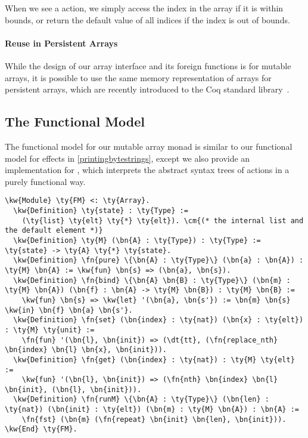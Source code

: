 When we see a  action, we simply access the index in the array if it is within bounds, or return the default value of all indices if the index is out of bounds.

\paragraph*{Reuse in Persistent Arrays} While the design of our array interface and its \gls{foreign function}s is for mutable arrays, it is possible to use the same memory representation of arrays for persistent arrays, which are recently introduced to the Coq standard library~\cite{conchon2007persistent, denes2013towards}.

\subsection{The Functional Model}

The \gls{functional model} for our mutable array monad is similar to our \gls{functional model} for effects in \autoref{printingbytestrings}, except we also provide an implementation for , which interprets the abstract syntax trees of actions in a purely functional way.

\begin{Verbatim}
\kw{Module} \ty{FM} <: \ty{Array}.
  \kw{Definition} \ty{state} : \ty{Type} :=
    (\ty{list} \ty{elt} \ty{*} \ty{elt}). \cm{(* the internal list and the default element *)}
  \kw{Definition} \ty{M} (\bn{A} : \ty{Type}) : \ty{Type} := \ty{state} -> \ty{A} \ty{*} \ty{state}.
  \kw{Definition} \fn{pure} \{\bn{A} : \ty{Type}\} (\bn{a} : \bn{A}) : \ty{M} \bn{A} := \kw{fun} \bn{s} => (\bn{a}, \bn{s}).
  \kw{Definition} \fn{bind} \{\bn{A} \bn{B} : \ty{Type}\} (\bn{m} : \ty{M} \bn{A}) (\bn{f} : \bn{A} -> \ty{M} \bn{B}) : \ty{M} \bn{B} :=
    \kw{fun} \bn{s} => \kw{let} '(\bn{a}, \bn{s'}) := \bn{m} \bn{s} \kw{in} \bn{f} \bn{a} \bn{s'}.
  \kw{Definition} \fn{set} (\bn{index} : \ty{nat}) (\bn{x} : \ty{elt}) : \ty{M} \ty{unit} :=
    \fn{fun} '(\bn{l}, \bn{init}) => (\dt{tt}, (\fn{replace_nth} \bn{index} \bn{l} \bn{x}, \bn{init})).
  \kw{Definition} \fn{get} (\bn{index} : \ty{nat}) : \ty{M} \ty{elt} :=
    \kw{fun} '(\bn{l}, \bn{init}) => (\fn{nth} \bn{index} \bn{l} \bn{init}, (\bn{l}, \bn{init})).
  \kw{Definition} \fn{runM} \{\bn{A} : \ty{Type}\} (\bn{len} : \ty{nat}) (\bn{init} : \ty{elt}) (\bn{m} : \ty{M} \bn{A}) : \bn{A} :=
    \fn{fst} (\bn{m} (\fn{repeat} \bn{init} \bn{len}, \bn{init})).
\kw{End} \ty{FM}.
\end{Verbatim}

